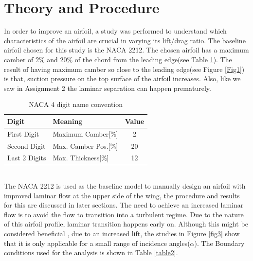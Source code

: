 \documentclass[main.tex]{subfiles}
\begin{document}
\section{Theory and Procedure}
In order to improve an airfoil, a study was performed to understand which characteristics of the airfoil are crucial in varying its lift/drag ratio. The baseline airfoil chosen for this study is the NACA 2212. The chosen airfoil has a maximum camber of 2\% and 20\% of the chord from the leading edge(see Table \ref{table1}). The result of having maximum camber so close to the leading edge(see Figure \ref{Fig1}) is that, suction pressure on the top surface of the airfoil increases. Also, like we saw in Assignment 2 the laminar separation can happen prematurely.\vspace*{-0.5em}
\\
\begin{table}[h]\begin{center}\begin{tabular}{ p{3cm} p{4.2cm} c } 
 \hline \rowcolor{lightgray}
  Digit & Meaning & Value\\
  \hline
 First Digit & Maximum Camber[\%] & 2 \\
 \hline
Second Digit & Max. Camber Pos.[\%] & 20  \\ 
\hline
Last 2 Digits & Max. Thickness[\%] & 12  \\ 
\hline
\end{tabular}\caption{NACA 4 digit name convention}\vspace*{-1em}\label{table1}\end{center}\end{table}\vspace*{-0.5em}
\\
The NACA 2212 is used as the baseline model to manually design an airfoil with improved laminar flow at the upper side of the wing, the procedure and results for this are discussed in later sections. The need to achieve an increased laminar flow is to avoid the flow to transition into a turbulent regime. Due to the nature of this airfoil profile, laminar transition happens early on. Although this might be considered beneficial , due to an increased lift, the studies in Figure \ref{fig3} show that it is only applicable for a small range of incidence angles($\alpha$). The Boundary conditions used for the analysis is shown in Table \ref{table2}.\vspace*{-0.5em}
\\
\end{document}
